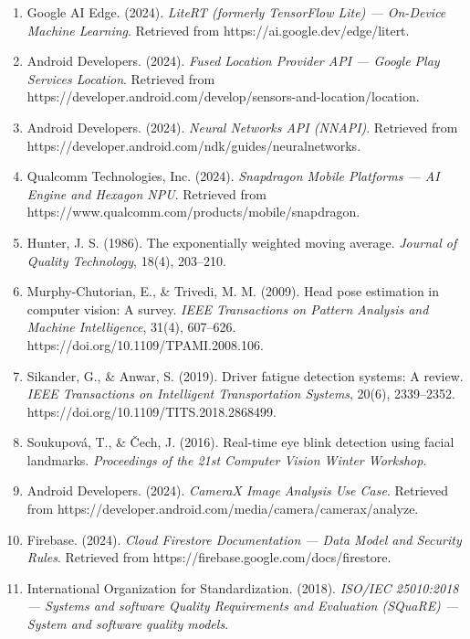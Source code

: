 \documentclass[11pt]{report}
\begin{document}
{\begin{enumerate}
    \item \label{google2024litert} Google AI Edge. (2024). \textit{LiteRT (formerly TensorFlow Lite) --- On-Device Machine Learning}. Retrieved from https://ai.google.dev/edge/litert.
    \item \label{android2024location} Android Developers. (2024). \textit{Fused Location Provider API --- Google Play Services Location}. Retrieved from https://developer.android.com/develop/sensors-and-location/location.
    \item \label{android2024nnapi} Android Developers. (2024). \textit{Neural Networks API (NNAPI)}. Retrieved from https://developer.android.com/ndk/guides/neuralnetworks.
    \item \label{qualcomm2024snapdragon} Qualcomm Technologies, Inc. (2024). \textit{Snapdragon Mobile Platforms --- AI Engine and Hexagon NPU}. Retrieved from https://www.qualcomm.com/products/mobile/snapdragon.
    \item \label{hunter1986ewma} Hunter, J. S. (1986). The exponentially weighted moving average. \textit{Journal of Quality Technology}, 18(4), 203--210.
    \item \label{murphychutorian2009headpose} Murphy-Chutorian, E., \& Trivedi, M. M. (2009). Head pose estimation in computer vision: A survey. \textit{IEEE Transactions on Pattern Analysis and Machine Intelligence}, 31(4), 607--626. https://doi.org/10.1109/TPAMI.2008.106.
    \item \label{sikander2019fatigue} Sikander, G., \& Anwar, S. (2019). Driver fatigue detection systems: A review. \textit{IEEE Transactions on Intelligent Transportation Systems}, 20(6), 2339--2352. https://doi.org/10.1109/TITS.2018.2868499.
    \item \label{soukupova2016blink} Soukupov\'{a}, T., \& \v{C}ech, J. (2016). Real-time eye blink detection using facial landmarks. \textit{Proceedings of the 21st Computer Vision Winter Workshop}.
    \item \label{android2024analysis} Android Developers. (2024). \textit{CameraX Image Analysis Use Case}. Retrieved from https://developer.android.com/media/camera/camerax/analyze.
    \item \label{firebase2024firestore} Firebase. (2024). \textit{Cloud Firestore Documentation --- Data Model and Security Rules}. Retrieved from https://firebase.google.com/docs/firestore.
    \item \label{iso25010} International Organization for Standardization. (2018). \textit{ISO/IEC 25010:2018 --- Systems and software Quality Requirements and Evaluation (SQuaRE) --- System and software quality models}.
\end{enumerate}
\par}
\end{document}

